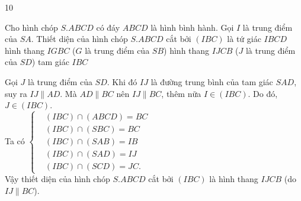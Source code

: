 \begin{indapan}{10}
\begin{ex}%
Cho hình chóp $S.ABCD$ có đáy $ABCD$ là hình bình hành. Gọi $I$ là trung điểm của $SA$. Thiết diện của hình chóp $S.ABCD$ cắt bởi $(IBC)$ là
\choice
{tứ giác $IBCD$}
{hình thang $IGBC$ ($G$ là trung điểm của $SB$)}
{\True hình thang $IJCB$ ($J$ là trung điểm của $SD$)}
{tam giác $IBC$}
\loigiai
{
\immini
{
Gọi $J$ là trung điểm của $SD$. Khi đó $IJ$ là đường trung bình của tam giác $SAD$, suy ra $IJ\parallel AD$. Mà $AD\parallel BC$ nên $IJ\parallel BC$, thêm nữa $I\in (IBC)$. Do đó, $J\in (IBC)$.\\
Ta có $\left\{\begin{aligned}&(IBC)\cap (ABCD)=BC \\&(IBC)\cap (SBC)=BC \\&(IBC)\cap (SAB)=IB\\&(IBC)\cap (SAD)=IJ \\&(IBC)\cap (SCD)=JC.\end{aligned}\right.$\\
Vậy thiết diện của hình chóp $S.ABCD$ cắt bởi $(IBC)$ là hình thang $IJCB$ (do $IJ\parallel BC$).
}
{
}
}
\end{ex}


\end{indapan}
